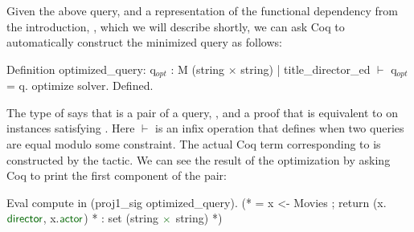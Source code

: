 \documentclass[preprint]{sigplanconf}
\begin{document}
Given the above query, and a representation of the functional dependency from the introduction, , which we will describe shortly, we can ask Coq to automatically construct the minimized query as follows:
\begin{coq}
Definition optimized_query:
{q$_{opt}$ : M (string $\times$ string) | title_director_ed $\vdash$ q$_{opt}$ = q}.
optimize solver.
Defined.
\end{coq}
The type of  says that  is a pair of a query, , and a proof that  is equivalent to  on instances satisfying .  Here $\vdash$ is an infix operation that defines when two queries are equal modulo some constraint.  The actual Coq term corresponding to  is constructed by the  tactic.  We can see the result of the optimization by asking Coq to print the first component of the pair:
\begin{coq}
Eval compute in (proj1_sig optimized_query).
(* = x <- Movies ; return (x.$\textcolor{dkgreen}{\textsf{director}}$, x.$\textcolor{dkgreen}{\textsf{actor}}$)
 *   : set (string $\textcolor{dkgreen}{\times}$ string)   *)
\end{coq}


 
\end{document}
